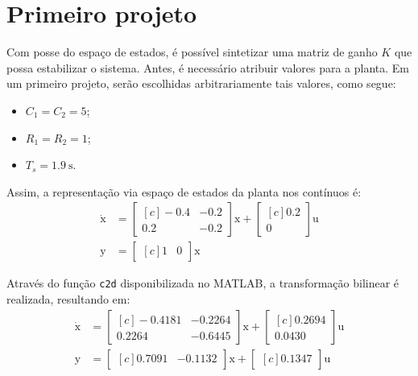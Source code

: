 \section{Primeiro projeto}
Com posse do espaço de estados, é possível sintetizar uma matriz de ganho $K$ que possa estabilizar o sistema. Antes, é necessário atribuir valores para a planta. Em um primeiro projeto, serão escolhidas arbitrariamente tais valores, como segue:
\begin{itemize}
  \item $C_1 = C_2 = 5$;
  \item $R_1 = R_2 = 1$;
  \item $T_s = \SI{1.9}{\second}$.
\end{itemize}

Assim, a representação via espaço de estados da planta nos contínuos é:
\begin{subequations}
  \begin{align}
    \dot{\pmb{\mathrm{x}}} &= \begin{bmatrix*}[c]
      -0.4 & -0.2\\
      0.2 & -0.2
    \end{bmatrix*}\pmb{\mathrm{x}} + \begin{bmatrix*}[c]
      0.2\\
      0
    \end{bmatrix*}\mathrm{u}\label{eq:SSCEntrada}\\
    \mathrm{y} &= \begin{bmatrix*}[c]
      1 & 0
    \end{bmatrix*}\pmb{\mathrm{x}}\label{eq:SSCSaida}
  \end{align}
\end{subequations}

Através do função \texttt{c2d} disponibilizada no MATLAB, a transformação bilinear é realizada, resultando em:
\begin{subequations}
  \begin{align}
    \dot{\pmb{\mathrm{x}}} &= \begin{bmatrix*}[c]
      -0.4181 & -0.2264\\
      0.2264 & -0.6445
    \end{bmatrix*}\pmb{\mathrm{x}} + \begin{bmatrix*}[c]
      0.2694\\
      0.0430
    \end{bmatrix*}\mathrm{u}\label{eq:SSDEntrada}\\
    \mathrm{y} &= \begin{bmatrix*}[c]
      0.7091 & -0.1132
    \end{bmatrix*}\pmb{\mathrm{x}} + \begin{bmatrix*}[c]
      0.1347
    \end{bmatrix*}\mathrm{u}\label{eq:SSDSaida}
  \end{align}
\end{subequations}

